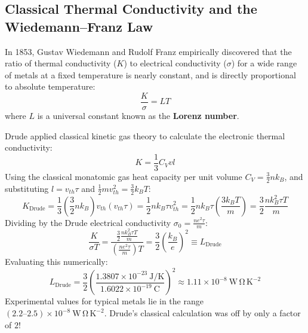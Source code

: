 \documentclass[11pt,a4paper]{article}
\begin{document}
\subsection{Classical Thermal Conductivity and the Wiedemann--Franz Law}
In 1853, Gustav Wiedemann and Rudolf Franz empirically discovered that the ratio of thermal conductivity ($K$) to electrical conductivity ($\sigma$) for a wide range of metals at a fixed temperature is nearly constant, and is directly proportional to absolute temperature:
\begin{equation}
\frac{K}{\sigma} = L T
\label{eq:wf_law}
\end{equation}
where $L$ is a universal constant known as the \textbf{Lorenz number}.

Drude applied classical kinetic gas theory to calculate the electronic thermal conductivity:
\begin{equation}
K = \frac{1}{3} C_V v l
\label{eq:kinetic_thermal_k}
\end{equation}
Using the classical monatomic gas heat capacity per unit volume $C_V = \frac{3}{2}n k_B$, and substituting $l = v_{th}\tau$ and $\frac{1}{2}m v_{th}^2 = \frac{3}{2}k_B T$:
\begin{equation}
K_{\mathrm{Drude}} = \frac{1}{3}\left(\frac{3}{2}n k_B\right) v_{th} (v_{th}\tau) = \frac{1}{2} n k_B \tau v_{th}^2 = \frac{1}{2} n k_B \tau \left(\frac{3k_B T}{m}\right) = \frac{3}{2} \frac{n k_B^2 \tau T}{m}
\end{equation}
Dividing by the Drude electrical conductivity $\sigma_0 = \frac{n e^2 \tau}{m}$:
\begin{equation}
\frac{K}{\sigma T} = \frac{\frac{3}{2}\frac{n k_B^2 \tau T}{m}}{\left(\frac{n e^2\tau}{m}\right)T} = \frac{3}{2}\left(\frac{k_B}{e}\right)^2 \equiv L_{\mathrm{Drude}}
\label{eq:drude_lorenz}
\end{equation}
Evaluating this numerically:
\begin{equation}
L_{\mathrm{Drude}} = \frac{3}{2}\left(\frac{1.3807 \times 10^{-23}\ \mathrm{J/K}}{1.6022 \times 10^{-19}\ \mathrm{C}}\right)^2 \approx 1.11 \times 10^{-8}\ \mathrm{W\,\Omega\,K^{-2}}
\end{equation}
Experimental values for typical metals lie in the range $(2.2\text{--}2.5) \times 10^{-8}\ \mathrm{W\,\Omega\,K^{-2}}$. Drude's classical calculation was off by only a factor of $2$! 
\end{document}
